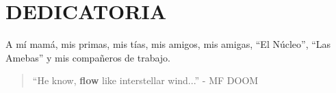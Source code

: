 \chapter*{DEDICATORIA}
A mí mamá, mis primas, mis tías, mis amigos, mis amigas, ``El Núcleo'', ``Las Amebas'' y mis compañeros de trabajo.\\
\vspace{14cm}

\begin{quote}
	``He know, \textbf{flow} like interstellar wind...'' - MF DOOM
\end{quote}
\thispagestyle{empty}

